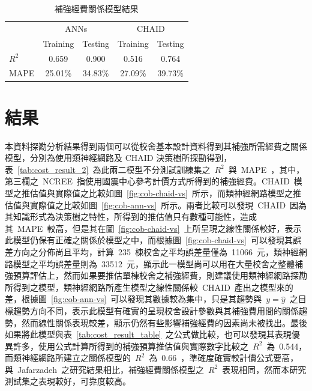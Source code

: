 

{\renewcommand{\arraystretch}{1.5}
\begin{table}[hbtp]
  \begin{center}
    \caption{補強經費關係模型結果}
    \label{tab:cost_result}
    \large
    \begin{tabular}{l c c c c}
      \hline
       & \multicolumn{2}{c}{ANNs} & \multicolumn{2}{c}{CHAID} \\
       & Training & Testing & Training & Testing \\
      \hline
      $R^2$ & 0.659 & 0.900 & 0.516 & 0.764 \\
      MAPE & 25.01\% &34.83\% & 27.09\% & 39.73\% \\
      \hline
      \end{tabular}
  \end{center}
\end{table}
}

\section{結果}

本資料探勘分析結果得到兩個可以從校舍基本設計資料得到其補強所需經費之關係模型，分別為使用類神經網路及 CHAID 決策樹所探勘得到，表~\ref{tab:cost_result_2}~為此兩二模型不分測試訓練集之~$R^2$~與~MAPE~，其中，第三欄之~NCREE~指使用國震中心參考計價方式所得到的補強經費。CHAID~模型之推估值與實際值之比較如圖~\ref{fig:cob-chaid-vs}~所示，而類神經網路模型之推估值與實際值之比較如圖~\ref{fig:cob-ann-vs}~所示。兩者比較可以發現~CHAID~因為其知識形式為決策樹之特性，所得到的推估值只有數種可能性，造成其~MAPE~較高，但是其在圖~\ref{fig:cob-chaid-vs}~上所呈現之線性關係較好，表示此模型仍保有正確之關係於模型之中，而根據圖~\ref{fig:cob-chaid-vs}~可以發現其誤差方向之分佈尚且平均，計算~235~棟校舍之平均誤差量僅為~11066~元，類神經網路模型之平均誤差量則為~33512~元，顯示此一模型尚可以用在大量校舍之整體補強預算評估上，然而如果要推估單棟校舍之補強經費，則建議使用類神經網路探勘所得到之模型，類神經網路所產生模型之線性關係較~CHAID~產出之模型來的差，根據圖~\ref{fig:cob-ann-vs}~可以發現其數據較為集中，只是其趨勢與~$y = \hat{y}$~之目標趨勢方向不同，表示此模型有確實的呈現校舍設計參數與其補強費用間的關係趨勢，然而線性關係表現較差，顯示仍然有些影響補強經費的因素尚未被找出。最後如果將此模型與表~\ref{tab:cost_result_table}~之公式做比較，也可以發現其表現優異許多，使用公式計算所得到的補強預算推估值與實際數字比較之~$R^2$~為~0.544，而類神經網路所建立之關係模型的~$R^2$~為~0.66~，準確度確實較計價公式要高，與~Jafarzadeh\cite{jafarzadeh2013predicting}\cite{jafarzadeh2013application}~之研究結果相比，補強經費關係模型之~$R^2$~表現相同，然而本研究測試集之表現較好，可靠度較高。


